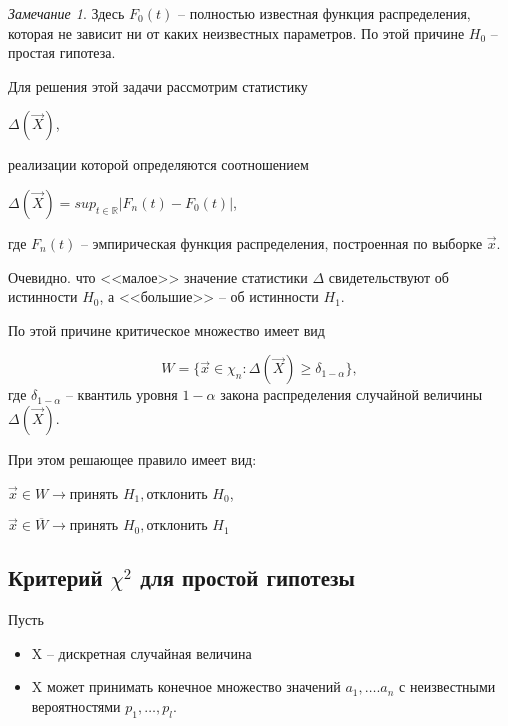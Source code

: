 \documentclass[a4paper, 12pt]{article}
\theoremstyle{definition}
\theoremstyle{leads}
\theoremstyle{example}
\theoremstyle{remark}
\newtheorem{remark}{Замечание}
\begin{document}
\begin{remark}
	Здесь $F_0(t)$ -- полностью известная функция распределения, которая не зависит ни от каких неизвестных параметров. По этой причине $H_0$ -- простая гипотеза.
\end{remark}

Для решения этой задачи рассмотрим статистику 
\begin{center}
	\centering
	$\Delta(\vec{X})$,
\end{center}

реализации которой определяются соотношением

\begin{center}
	$\Delta(\vec{X}) = sup_{t \in \mathbb{R}} |F_n(t) - F_0(t)|$,
\end{center}
где $F_n(t)$ -- эмпирическая функция распределения, построенная по выборке $\vec{x}$.

Очевидно. что <<малое>> значение статистики $\Delta$ свидетельствуют об истинности $H_0$, а <<большие>> -- об истинности $H_1$.

По этой причине критическое множество имеет вид

\begin{equation*}
	W = \{ \vec{x} \in \chi_n : \Delta(\vec{X}) \geq \delta_{1 - \alpha} \},
\end{equation*}
где $\delta_{1 - \alpha}$ -- квантиль уровня $1 - \alpha$ закона распределения случайной величины $\Delta(\vec{X})$.

При этом решающее правило имеет вид: 
\begin{center}
	\centering
	$\vec{x} \in W \rightarrow \text{принять  } H_1,  \text{отклонить } H_0$,
	
	$\vec{x} \in \overline{W} \rightarrow \text{принять } H_0, \text{отклонить  } H_1$
\end{center}

\subsection{Критерий $\chi^2$ для простой гипотезы}

Пусть 

\begin{itemize}
    \item X -- дискретная случайная величина
    \item X может принимать конечное множество значений $a_1, \dots. a_n$ с неизвестными вероятностями $p_1, \dots, p_l$.	
\end{itemize}
\end{document}
